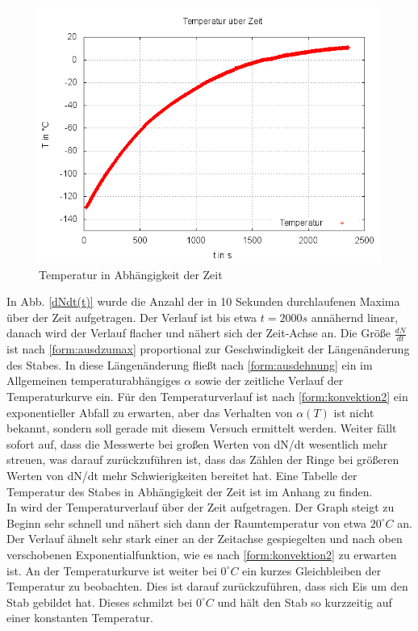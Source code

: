 \begin{figure}
\centering
	\includegraphics[width=.8\textwidth]{images/T(t).png}
\caption{Temperatur in Abhängigkeit der Zeit}
\label{plot:Tt}
\end{figure}

In Abb. \ref{dNdt(t)} wurde die Anzahl der in 10 Sekunden durchlaufenen Maxima über der Zeit aufgetragen. Der Verlauf
ist bis etwa $ t = 2000 s$ annähernd linear, danach wird der Verlauf flacher und nähert sich der Zeit-Achse an. Die Größe
$ \frac{dN}{dt} $ ist nach \eqref{form:ausdzumax} proportional zur Geschwindigkeit der Längenänderung des Stabes. In diese
Längenänderung fließt nach \eqref{form:ausdehnung} ein im Allgemeinen temperaturabhängiges $ \alpha $ sowie der zeitliche 
Verlauf der Temperaturkurve ein. Für den Temperaturverlauf ist nach \eqref{form:konvektion2} ein exponentieller Abfall
zu erwarten, aber das Verhalten von $ \alpha(T) $ ist nicht bekannt, sondern soll gerade mit diesem Versuch ermittelt werden. 
Weiter fällt sofort auf, dass die Messwerte bei großen Werten von dN/dt wesentlich
mehr streuen, was darauf zurückzuführen ist, dass das Zählen der Ringe bei größeren Werten von dN/dt mehr 
Schwierigkeiten bereitet hat.
Eine Tabelle der Temperatur des Stabes in Abhängigkeit der Zeit ist im Anhang zu finden. \\


In  wird der Temperaturverlauf über der Zeit aufgetragen. Der Graph steigt zu Beginn sehr schnell und nähert
sich dann der Raumtemperatur von etwa $ 20 ^{\circ} C $ an. Der Verlauf ähnelt sehr stark einer an der Zeitachse 
gespiegelten und nach oben verschobenen Exponentialfunktion, wie es nach \eqref{form:konvektion2} zu erwarten ist. 
An der Temperaturkurve ist weiter bei $ 0 ^{\circ} C $ ein kurzes Gleichbleiben der Temperatur zu beobachten. Dies ist darauf zurückzuführen, dass sich Eis um den Stab gebildet hat. Dieses schmilzt bei $ 0 ^{\circ} C $ und hält den Stab so kurzzeitig auf einer konstanten Temperatur.

